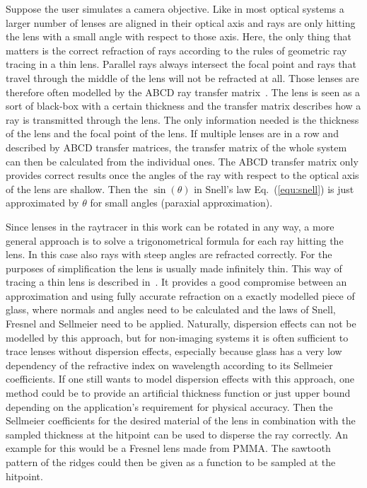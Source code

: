 \documentclass[a4paper,10pt]{article}
\newcommand{\equref}[1]{Eq.~(\ref{#1})}
\begin{document}
    Suppose the user simulates a camera objective.
    Like in most optical systems a larger number of lenses are 
    aligned in their optical axis and rays are only hitting the lens
    with a small angle with respect to those axis.
    Here, the only thing that matters is the correct refraction of
    rays according to the rules of geometric ray tracing in a thin lens.
    Parallel rays always intersect the focal point and rays that
    travel through the middle of the lens will not be refracted
    at all.
    Those lenses are therefore often modelled by the ABCD ray transfer
    matrix~\cite{abcd_lens_rpphotonics}.
    The lens is seen as a sort of black-box with a certain thickness
    and the transfer matrix describes how a ray is transmitted
    through the lens.
    The only information needed is the thickness of the lens and
    the focal point of the lens.
    If multiple lenses are in a row and described by ABCD transfer matrices,
    the transfer matrix of the whole system can then be calculated
    from the individual ones.
    The ABCD transfer matrix only provides correct results once the
    angles of the ray with respect to the optical axis of the lens
    are shallow.
    Then the $\sin(\theta)$ in Snell's law \equref{equ:snell} is
    just approximated by $\theta$ for small angles (paraxial approximation).

    Since lenses in the raytracer in this work can be rotated in any way,
    a more general approach is to solve a trigonometrical formula for
    each ray hitting the lens.
    In this case also rays with steep angles are refracted correctly.
    For the purposes of simplification the lens is usually made 
    infinitely thin.
    This way of tracing a thin lens is described in~\cite{thin_lens}.
    It provides a good compromise between an approximation and using 
    fully accurate refraction on a exactly modelled piece of glass, where normals and angles need to
    be calculated and the laws of Snell, Fresnel and Sellmeier need to be applied.
    Naturally, dispersion effects can not be modelled by this approach,
    but for non-imaging systems it is often sufficient to trace lenses
    without dispersion effects, especially because glass has a very
    low dependency of the refractive index on wavelength according to
    its Sellmeier coefficients.
    If one still wants to model dispersion effects with this approach,
    one method could be to provide an artificial thickness function 
    or just upper bound depending on the application's requirement for
    physical accuracy.
    Then the Sellmeier coefficients for the desired material of the lens
    in combination with the sampled thickness at the hitpoint can be used
    to disperse the ray correctly.
    An example for this would be a Fresnel lens made from PMMA.
    The sawtooth pattern of the ridges could then be given as a function
    to be sampled at the hitpoint.
\end{document}

